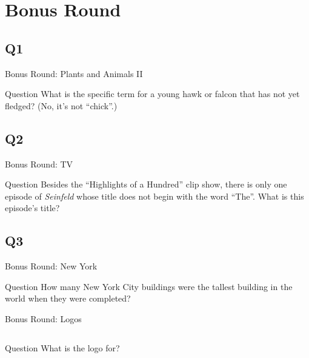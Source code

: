 \documentclass[11pt]{beamer}
\begin{document}
\section{Bonus Round}
\subsection*{Q1}
\begin{frame}[t]{Bonus Round: Plants and Animals II}
\begin{block}{Question}
What is the specific term for a young hawk or falcon that has not yet fledged? (No, it's not ``chick''.)
\end{block}
\end{frame}
\subsection*{Q2}
\begin{frame}[t]{Bonus Round: TV}
\begin{block}{Question}
Besides the ``Highlights of a Hundred'' clip show, there is only one episode of \emph{Seinfeld} whose title does not begin with the word ``The''. What is this episode's title?
\end{block}
\end{frame}
\subsection*{Q3}
\begin{frame}[t]{Bonus Round: New York}
\begin{block}{Question}
How many New York City  buildings were the tallest building in the world when they were completed?
\end{block}
\end{frame}
\begin{frame}[t]{Bonus Round: Logos}
\begin{columns}[T,totalwidth=\linewidth]
\begin{column}{0.47\linewidth}
\begin{block}{Question}
What is the logo for?
\end{block}
\end{column}
\begin{column}{0.47\linewidth}
\texttt{[image: \{Images/paris2024bid]}.png}
\end{column}
\end{columns}
\end{frame}
\end{document}
